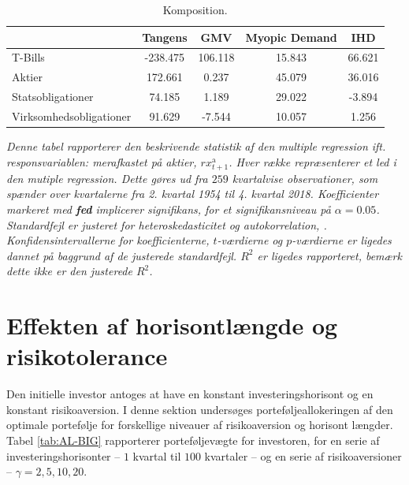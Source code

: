 \documentclass[
  a4paper,
  oneside]{memoir}
\begin{document}
\begin{table}[H]

\caption{\label{tab:AL-KOMP}Komposition.}
\centering
\begin{threeparttable}
\begin{tabular}[t]{lcccc}
\toprule
  & Tangens & GMV & Myopic Demand & IHD\\
\midrule
\rowcolor{gray!6}  T-Bills & -238.475 & 106.118 & 15.843 & 66.621\\
Aktier & 172.661 & 0.237 & 45.079 & 36.016\\
\rowcolor{gray!6}  Statsobligationer & 74.185 & 1.189 & 29.022 & -3.894\\
Virksomhedsobligationer & 91.629 & -7.544 & 10.057 & 1.256\\
\bottomrule
\end{tabular}
\begin{tablenotes}
\item \textit{Denne tabel rapporterer den beskrivende statistik af den multiple regression ift. responsvariablen: merafkastet på aktier, $rx_{t+1}^{\text{a}}$. Hver række repræsenterer et led i den mutiple regression. Dette gøres ud fra $259$ kvartalvise observationer, som spænder over kvartalerne fra 2. kvartal 1954 til 4. kvartal 2018. Koefficienter markeret med \textbf{fed} implicerer signifikans, for et signifikansniveau på $\alpha=0.05$. Standardfejl er justeret for heteroskedasticitet og autokorrelation, \citep{Newey1987}. Konfidensintervallerne for koefficienterne, $t$-værdierne og $p$-værdierne er ligedes dannet på baggrund af de justerede standardfejl. $R^2$ er ligedes rapporteret, bemærk dette ikke er den justerede $R^2$.}
\end{tablenotes}
\end{threeparttable}
\end{table}

\hypertarget{effekten-af-horisontluxe6ngde-og-risikotolerance}{%
\section{Effekten af horisontlængde og risikotolerance}\label{effekten-af-horisontluxe6ngde-og-risikotolerance}}

Den initielle investor antoges at have en konstant investeringshorisont og en konstant risikoaversion. I denne sektion undersøges porteføljeallokeringen af den optimale portefølje for forskellige niveauer af risikoaversion og horisont længder. Tabel \ref{tab:AL-BIG} rapporterer porteføljevægte for investoren, for en serie af investeringshorisonter -- \(1\) kvartal til \(100\) kvartaler -- og en serie af risikoaversioner -- \(\gamma=2,5,10,20\).
\end{document}
